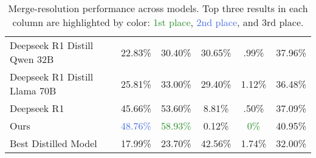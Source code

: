 \begin{table*}[ht]
\begin{tabular}{lccccc}
Deepseek R1 Distill Qwen 32B & 22.83\% & 30.40\% & 30.65\% & .99\% & 37.96\% \\
Deepseek R1 Distill Llama 70B & 25.81\% & 33.00\% & 29.40\% & 1.12\% & 36.48\% \\
Deepseek R1 & 45.66\% & \textcolor{BurntOrange}{53.60\%} & 8.81\% & .50\% & 37.09\% \\
Ours & \textcolor{RoyalBlue}{48.76\%} & \textcolor{ForestGreen}{58.93\%} & 0.12\% & \textcolor{ForestGreen}{0\%} & 40.95\% \\
Best Distilled Model & 17.99\% & 23.70\% & 42.56\% & 1.74\% & 32.00\% \\
\bottomrule
\end{tabular}
\caption{Merge-resolution performance across models. Top three results in each column are highlighted by color: \textcolor{ForestGreen}{1st place}, \textcolor{RoyalBlue}{2nd place}, and \textcolor{BurntOrange}{3rd place}.}
\end{table*}
